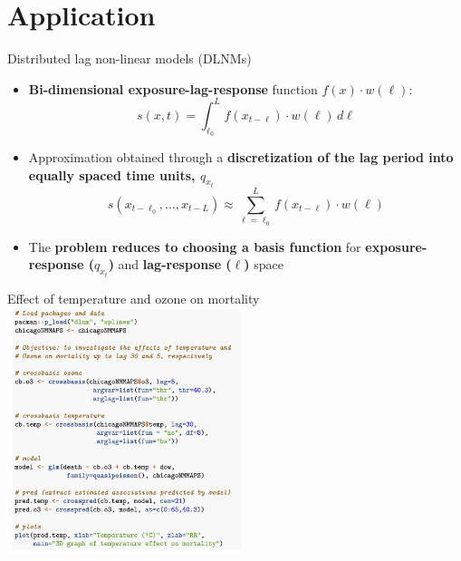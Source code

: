 \documentclass[english]{beamer}
\newcommand{\alertblue}[1]{{\color{blue}#1}}
\begin{document}
\section{Application}
\begin{frame}{Distributed lag non-linear models (DLNMs)}
        \begin{itemize}
        \item \textbf{\alertblue{Bi-dimensional exposure-lag-response}} function 
        \alertblue{\( f(x) \cdot w(\ell) \)}: 
        \[
        s(x, t) = \int_{\ell_0}^{L} f(x_{t-\ell}) \cdot w(\ell) \, d\ell \] 
        \item Approximation obtained through a \textbf{\alertblue{discretization of the lag period into equally spaced time units, \( q_{x_t} \)}}
        \[
        s(x_{t-\ell_0}, \dots, x_{t-L}) \approx \sum_{\ell = \ell_0}^{L} f(x_{t-\ell}) \cdot w( \ell)
        \]
        \item The \textbf{\alertblue{problem reduces to choosing a basis function}} for \textbf{\alertblue{exposure-response (\( q_{x_t} \))}} and \textbf{\alertblue{lag-response (\( \ell \))}} space  
\end{itemize}
\end{frame}
\begin{frame}{Effect of temperature and ozone on mortality}
\centering
    \includegraphics[width=6.83cm,keepaspectratio]{images/code_example_1.png}
\end{frame}
\end{document}
